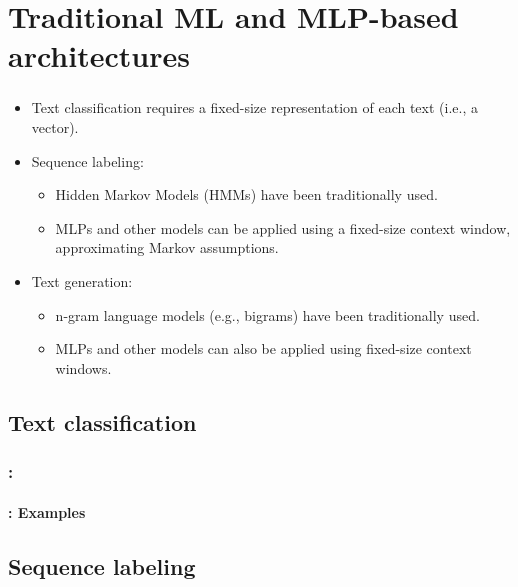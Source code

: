 \documentclass[xcolor=table]{beamer}
\begin{document}
\section{Traditional ML and MLP-based architectures}

\begin{frame}
	\frametitle{\insertshortsubtitle}
	\framesubtitle{\insertsection}
	
	\begin{itemize}
		\item Text classification requires a fixed-size representation of each text (i.e., a vector).
		
		\item Sequence labeling:
		\begin{itemize}
			\item Hidden Markov Models (HMMs) have been traditionally used.
			\item MLPs and other models can be applied using a fixed-size context window, approximating Markov assumptions.
		\end{itemize}
		
		\item Text generation:
		\begin{itemize}
			\item n-gram language models (e.g., bigrams) have been traditionally used.
			\item MLPs and other models can also be applied using fixed-size context windows.
		\end{itemize}
	\end{itemize}
	
\end{frame}


\subsection{Text classification}

\begin{frame}
	\frametitle{\insertshortsubtitle: \insertsection}
	\framesubtitle{\insertsubsection: Examples}
	
	
\end{frame}

\subsection{Sequence labeling}
\end{document}
